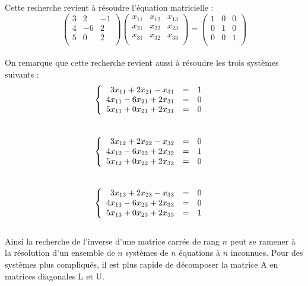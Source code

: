 \documentclass[a4paper,12pt]{report}
\begin{document}
Cette recherche revient à résoudre l'équation matricielle : \\
$$\begin{pmatrix}
	3 & 2 & -1 \\
	4 & -6 & 2\\
	5 & 0 & 2\\
\end{pmatrix}
\begin{pmatrix}
x_{11} & x_{12} & x_{13} \\
x_{21} & x_{22} & x_{23}\\
x_{31} & x_{32} & x_{33}\\
\end{pmatrix} 
=\begin{pmatrix}
	1 & 0 & 0 \\
	0 & 1 & 0\\
	0 & 0 & 1\\
\end{pmatrix}$$
\\
On remarque que cette recherche revient aussi à résoudre les trois systèmes suivants : \\
$$
\
\left\{
\begin{array}{r c c l}
3x_{11}+2x_{21}-x_{31} &=&1&\\
4x_{11}-6x_{21}+2x_{31}&=&0&\\
5x_{11}+0x_{21}+2x_{31}&=&0&
\end{array}
\right.
\\
$$
\\
$$
\
\left\{
\begin{array}{r c c l}
3x_{12}+2x_{22}-x_{32} &=&0&\\
4x_{12}-6x_{22}+2x_{32}&=&1&\\
5x_{12}+0x_{22}+2x_{32}&=&0&
\end{array}
\right.
\\$$
\\
$$
\
\left\{
\begin{array}{r c c l}
3x_{13}+2x_{23}-x_{33} &=&0&\\
4x_{13}-6x_{23}+2x_{33}&=&0&\\
5x_{13}+0x_{23}+2x_{33}&=&1&
\end{array}
\right.
\\$$
\\
Ainsi la recherche de l’inverse d’une matrice carrée de rang $n$ peut se ramener à la résolution d’un ensemble de $n$ systèmes de $n$ équations à $n$ inconnues. Pour des systèmes plus compliqués, il est plus rapide de décomposer la matrice A en matrices diagonales L et U.\\
\newpage
\end{document}
